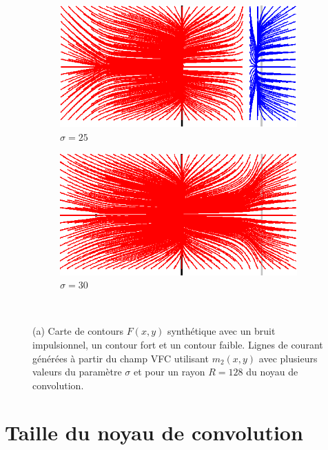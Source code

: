 \begin{figure}[!h]
   \begin{subfigure}[c]{.5\linewidth}
     \centering
     \includegraphics[width=\textwidth]{Chapters/Images/m2_sigma_25.png}
     \caption{$\sigma=25$}
   \end{subfigure}
   \begin{subfigure}[c]{.5\linewidth}
     \centering
     \includegraphics[width=\textwidth]{Chapters/Images/m2_sigma_30.png}
     \caption{$\sigma=30$}
   \end{subfigure}\\
   
   \caption{(a) Carte de contours $F(x,y)$ synthétique avec un bruit impulsionnel, un contour fort et un contour faible. Lignes de courant générées à partir du champ VFC utilisant $m_2(x,y)$ avec plusieurs valeurs du paramètre $\sigma$ et pour un rayon $R=128$ du noyau de convolution.}
   \label{fig:sigma}
\end{figure}

\section{Taille du noyau de convolution}

